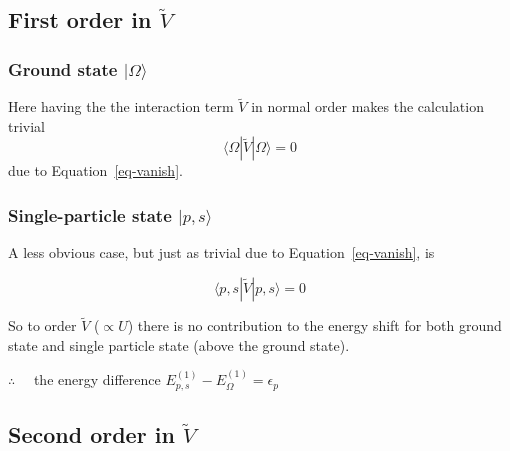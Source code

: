 \documentclass[
  letterpaper,
  DIV=11,
  numbers=noendperiod]{scrartcl}
\begin{document}
\subsection{\texorpdfstring{First order in
\(\tilde V\)}{First order in \textbackslash tilde V}}\label{first-order-in-tilde-v}

\subsubsection{\texorpdfstring{Ground state
\(|\Omega\rangle\)}{Ground state \textbar\textbackslash Omega\textbackslash rangle}}\label{ground-state-omegarangle-1}

Here having the the interaction term \(\tilde V\) in normal order makes
the calculation trivial \[
\langle \Omega|\tilde V|\Omega\rangle=0
\] due to Equation~\ref{eq-vanish}.

\subsubsection{\texorpdfstring{Single-particle state
\(|p,s\rangle\)}{Single-particle state \textbar p,s\textbackslash rangle}}\label{single-particle-state-psrangle-1}

A less obvious case, but just as trivial due to
Equation~\ref{eq-vanish}, is

\[
\langle p,s|\tilde V|p,s\rangle=0
\]

So to order \(\tilde V\) (\(\propto U\)) there is no contribution to the
energy shift for both ground state and single particle state (above the
ground state).

\begin{tcolorbox}[enhanced jigsaw, arc=.35mm, bottomrule=.15mm, bottomtitle=1mm, breakable, colback=white, colbacktitle=quarto-callout-note-color!10!white, colframe=quarto-callout-note-color-frame, coltitle=black, left=2mm, leftrule=.75mm, opacityback=0, opacitybacktitle=0.6, rightrule=.15mm, title=\textcolor{quarto-callout-note-color}{\faInfo}\hspace{0.5em}{Energy difference at \(\mathcal{O}(V)\)}, titlerule=0mm, toprule=.15mm, toptitle=1mm]

\(\therefore\quad\) the energy difference
\(E^{(1)}_{p,s}-E^{(1)}_\Omega=\epsilon_p\)

\end{tcolorbox}

\subsection{\texorpdfstring{Second order in
\(\tilde V\)}{Second order in \textbackslash tilde V}}\label{second-order-in-tilde-v}
\end{document}
